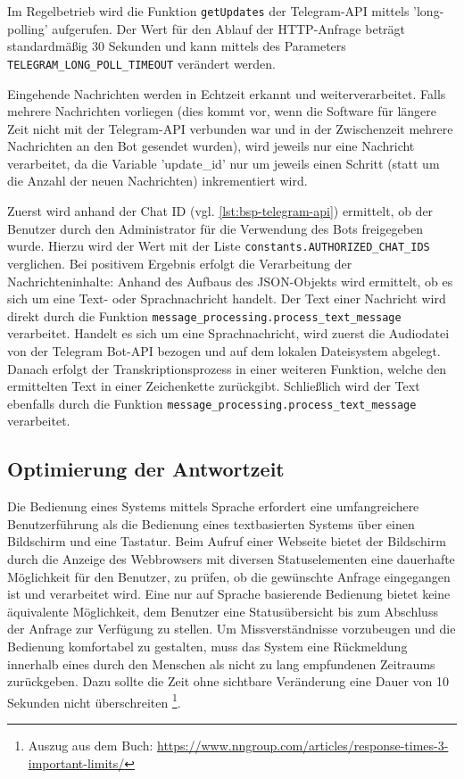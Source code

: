 Im Regelbetrieb wird die Funktion \lstinline{getUpdates} der Telegram-API mittels 'long-polling' aufgerufen. Der Wert für den Ablauf der HTTP-Anfrage beträgt standardmäßig 30 Sekunden und kann mittels des Parameters \lstinline{TELEGRAM_LONG_POLL_TIMEOUT} verändert werden.

Eingehende Nachrichten werden in Echtzeit erkannt und weiterverarbeitet. Falls mehrere Nachrichten vorliegen (dies kommt vor, wenn die Software für längere Zeit nicht mit der Telegram-API verbunden war und in der Zwischenzeit mehrere Nachrichten an den Bot gesendet wurden), wird jeweils nur eine Nachricht verarbeitet, da die Variable 'update\_id' nur um jeweils einen Schritt (statt um die Anzahl der neuen Nachrichten) inkrementiert wird. 

Zuerst wird anhand der Chat ID (vgl. \autoref{lst:bsp-telegram-api}) ermittelt, ob der Benutzer durch den Administrator für die Verwendung des Bots freigegeben wurde. Hierzu wird der Wert mit der Liste \lstinline{constants.AUTHORIZED_CHAT_IDS} verglichen. Bei positivem Ergebnis erfolgt die Verarbeitung der Nachrichteninhalte: Anhand des Aufbaus des JSON-Objekts wird ermittelt, ob es sich um eine Text- oder Sprachnachricht handelt. Der Text einer Nachricht wird direkt durch die Funktion \lstinline{message_processing.process_text_message} verarbeitet. Handelt es sich um eine Sprachnachricht, wird zuerst die Audiodatei von der Telegram Bot-API bezogen und auf dem lokalen Dateisystem abgelegt. Danach erfolgt der Transkriptionsprozess in einer weiteren Funktion, welche den ermittelten Text in einer Zeichenkette zurückgibt. Schließlich wird der Text ebenfalls durch die Funktion \lstinline{message_processing.process_text_message} verarbeitet.

\subsection{Optimierung der Antwortzeit}

Die Bedienung eines Systems mittels Sprache erfordert eine umfangreichere Benutzerführung als die Bedienung eines textbasierten Systems über einen Bildschirm und eine Tastatur. Beim Aufruf einer Webseite bietet der Bildschirm durch die Anzeige des Webbrowsers mit diversen Statuselementen eine dauerhafte Möglichkeit für den Benutzer, zu prüfen, ob die gewünschte Anfrage eingegangen ist und verarbeitet wird. Eine nur auf Sprache basierende Bedienung bietet keine äquivalente Möglichkeit, dem Benutzer eine Statusübersicht bis zum Abschluss der Anfrage zur Verfügung zu stellen. Um Missverständnisse vorzubeugen und die Bedienung komfortabel zu gestalten, muss das System eine Rückmeldung innerhalb eines durch den Menschen als nicht zu lang empfundenen Zeitraums zurückgeben. Dazu sollte die Zeit ohne sichtbare Veränderung eine Dauer von 10 Sekunden nicht überschreiten \cite[Kapitel 5.5]{response-time}\footnote{Auszug aus dem Buch: \url{https://www.nngroup.com/articles/response-times-3-important-limits/}}. 

